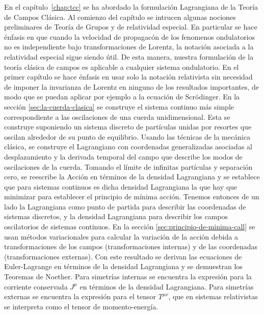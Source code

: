En el capítulo~\ref{chap:tcc} se ha abordado la formulación
Lagrangiana de la Teoría de Campos Clásica.  Al comienzo del capítulo
se intrucen algunas nociones preliminares de Teoría de Grupos y de
relatividad especial. En particular se hace énfasis en que cuando la
velocidad de propagacón de los fenomenos ondulatorios no es
independiente bajo transformaciones de Lorentz, la notación asociada a
la relatividad especial sigue siendo útil. De esta manera, nuestra
formulación de la teoría clásica de campos es aplicable a cualquier
sistema ondulatorio. En el primer capítulo se hace énfasis en usar
solo la notación relativista sin necesidad de imponer la invarianza de
Lorentz en ninguno de los resultados importantes, de modo que se
puedan aplicar por ejemplo a la ecuación de Scrödinger.
%
%
En la sección \ref{sec:la-cuerda-clasica} se construye el sistema continuo más simple correspondiente a las oscilaciones de una cuerda unidimensional. Esta se construye suponiendo un sistema discreto de partículas unidas por resortes que oscilan alrededor de su punto de equilibrio. Usando las técnicas de la mecánica clásica, se construye el Lagrangiano con coordenadas generalizadas asociadas al desplazamiento y la derivada temporal del campo que describe los modos de oscilaciones de la cuerda. Tomando el límite de infinitas partículas y separación cero, se reescribe la Acción en términos de la densidad Lagrangiana y se establece que para sistemas continuos es dicha densidad Lagrangiana la que hay que minimizar para establecer el principio de mínima acción. Tenemos entonces de un lado la Lagrangiana como punto de partida para describir las coordenadas de sistemas discretos, y la densidad Lagrangiana para describir los campos oscilatorios de sistemas continuos. 
%
En la sección \ref{sec:principio-de-minima-call} se usan métodos variacionales para calcular la variación de la acción debida a transformaciones de los campos (transformaciones internas) y de las coordenadas (transformaciones externas). Con este resultado se derivan las ecuaciones de Euler-Lagrange en términos de la densidad Lagrangiana y se demuestran los  Teoremas de Noether. Para simetrías internas se encuentra la expresión para la corriente conservada $J^\mu$ en términos de la densidad Lagrangiana. Para simetrías externas se encuentra la expresión para el tensor $T^{\mu\nu}$, que en sistemas relativistas se interpreta como el tensor de momento-energía. 


